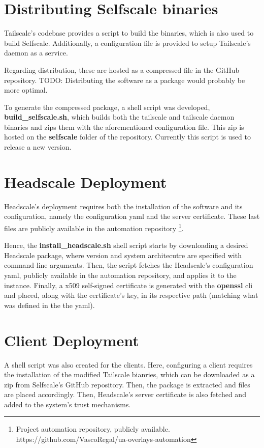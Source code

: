 \documentclass[11pt,twoside,a4paper]{report}
\begin{document}
\section{Distributing Selfscale binaries}

Tailscale's codebase provides a script to build the binaries, which is also used to build Selfscale. Additionally, a configuration file is provided to setup Tailscale's daemon as a service.

Regarding distribution, these are hosted as a compressed file in the GitHub repository. TODO: Distributing the software as a package would probably be more optimal.

To generate the compressed package, a shell script was developed, \textbf{build\_selfscale.sh}, which builds both the tailscale and tailscale daemon binaries and zips them with the aforementioned configuration file. This zip is hosted on the \textbf{selfscale} folder of the repository. Currently this script is used to release a new version.

\section{Headscale Deployment}

Headscale's deployment requires both the installation of the software and its configuration, namely the configuration yaml and the server certificate. These last files are publicly available in the automation repository \footnote{Project automation repository, publicly available. https://github.com/VascoRegal/ua-overlays-automation}.

Hence, the \textbf{install\_headscale.sh} shell script starts by downloading a desired Headscale package, where version and system architecutre are specified with command-line arguments. Then, the script fetches the Headscale's configuration yaml, publicly available in the automation repository, and applies it to the instance. Finally, a x509 self-signed certificate is generated with the \textbf{openssl} \ac{cli} and placed, along with the certificate's key, in its respective path (matching what was defined in the the yaml).

\section{Client Deployment}

A shell script was also created for the clients. Here, configuring a client requires the installation of the modified Tailscale bianries, which can be downloaded as a zip from Selfscale's GitHub repository. Then, the package is extracted and files are placed accordingly. Then, Headscale's server certificate is also fetched and added to the system's trust mechanisms. 
\end{document}
